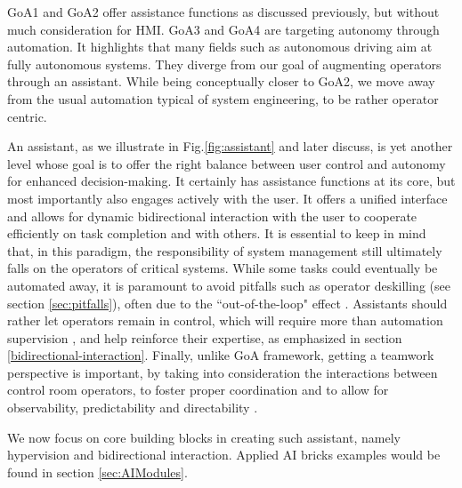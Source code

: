 \documentclass{IOS-Book-Article}
\begin{document}
GoA1 and GoA2 offer assistance functions as discussed previously, but without much consideration for HMI. GoA3 and GoA4 are targeting autonomy through automation. It highlights that many fields such as autonomous driving \cite{barabas2017current} aim at fully autonomous systems. They diverge from our goal of augmenting operators through an assistant. While being conceptually closer to GoA2, we move away from the usual automation typical of system engineering, to be rather operator centric. 

An assistant, as we illustrate in Fig.\ref{fig:assistant} 
and later discuss, is yet another level whose goal is to offer the right balance between user control and autonomy \cite{heer2019agency} for enhanced decision-making. It certainly has assistance functions at its core, but most importantly also engages actively with the user. It offers a unified interface and allows for dynamic bidirectional interaction with the user to cooperate efficiently on task completion and with others. It is essential to keep in mind that, in this paradigm, the responsibility of system management still ultimately falls on the operators of critical systems. While some tasks could eventually be automated away, it is paramount to avoid pitfalls such as operator deskilling (see section \ref{sec:pitfalls}), often due to the ``out-of-the-loop" effect \cite{prostejovsky2019future}. Assistants should rather let operators remain in control, which will require more than automation supervision \cite{baileytraining}, and help reinforce their expertise, as emphasized in section \ref{bidirectional-interaction}. Finally, unlike GoA framework, getting a teamwork perspective is important, by taking into consideration the interactions between control room operators, to foster proper coordination and to allow for observability, predictability and directability \cite{johnson2018tomorrow}. 

We now focus on core building blocks in creating such assistant, namely hypervision and bidirectional interaction. Applied AI bricks examples would be found in section \ref{sec:AIModules}.
\end{document}
